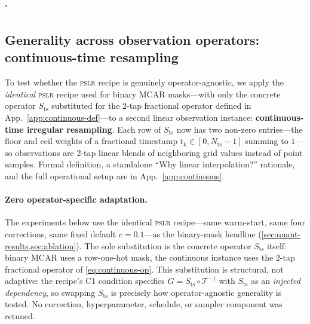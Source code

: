 "\documentclass{article}
\theoremstyle{plain}
\theoremstyle{definition}
\theoremstyle{remark}
\newcommand{\imgts}{\mathcal{T}^{-1}}
\newcommand{\pslr}{\textsc{pslr}}
\newcommand{\Nts}{N_{\mathrm{ts}}}
\begin{document}
\vspace{-1mm}
\subsection{Generality across observation operators: continuous-time resampling}
\label{sec:continuous-operator}
\vspace{-1mm}

To test whether the \pslr{} recipe is genuinely operator-agnostic, we apply the \emph{identical} \pslr{} recipe used for binary MCAR masks---with only the concrete operator $S_{\mathrm{ts}}$ substituted for the $2$-tap fractional operator defined in App.~\ref{app:continuous-def}---to a second linear observation instance: \textbf{continuous-time irregular resampling}. Each row of $S_{\mathrm{ts}}$ now has two non-zero entries---the floor and ceil weights of a fractional timestamp $t_k \in [0, \Nts{-}1]$ summing to $1$---so observations are 2-tap linear blends of neighboring grid values instead of point samples. Formal definition, a standalone ``Why linear interpolation?'' rationale, and the full operational setup are in App.~\ref{app:continuous}.

\paragraph{Zero operator-specific adaptation.}
The experiments below use the identical \pslr{} recipe---same warm-start, same four corrections, same fixed default $c = 0.1$---as the binary-mask headline (\cref{sec:quant-results,sec:ablation}). The sole substitution is the concrete operator $S_{\mathrm{ts}}$ itself: binary MCAR uses a row-one-hot mask, the continuous instance uses the $2$-tap fractional operator of \cref{eq:continuous-op}. This substitution is structural, not adaptive: the recipe's C1 condition specifies $G = S_{\mathrm{ts}} \circ \imgts$ with $S_{\mathrm{ts}}$ as an \emph{injected dependency}, so swapping $S_{\mathrm{ts}}$ is precisely how operator-agnostic generality is tested. No correction, hyperparameter, schedule, or sampler component was retuned.
\end{document}
